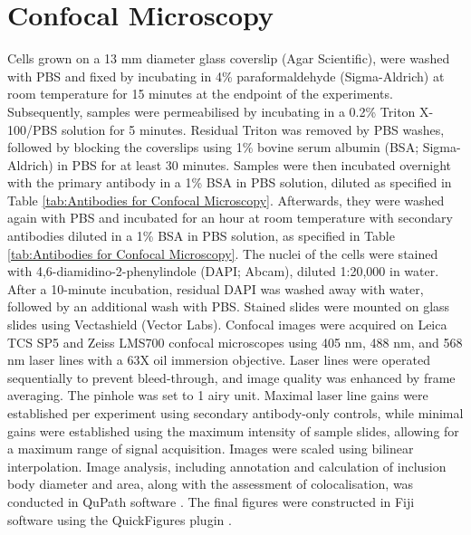 \section{Confocal Microscopy} \label{sec:Confocal Microscopy}
Cells grown on a 13 mm diameter glass coverslip (Agar Scientific), were washed with PBS and fixed by incubating in 4\% paraformaldehyde (Sigma-Aldrich) at room temperature for 15 minutes at the endpoint of the experiments. Subsequently, samples were permeabilised by incubating in a 0.2\% Triton X-100/PBS solution for 5 minutes. Residual Triton was removed by PBS washes, followed by blocking the coverslips using 1\% bovine serum albumin (BSA; Sigma-Aldrich) in PBS for at least 30 minutes. Samples were then incubated overnight with the primary antibody in a 1\% BSA in PBS solution, diluted as specified in Table \ref{tab:Antibodies for Confocal Microscopy}. Afterwards, they were washed again with PBS and incubated for an hour at room temperature with secondary antibodies diluted in a 1\% BSA in PBS solution, as specified in Table \ref{tab:Antibodies for Confocal Microscopy}. The nuclei of the cells were stained with 4,6-diamidino-2-phenylindole (DAPI; Abcam), diluted 1:20,000 in water. After a 10-minute incubation, residual DAPI was washed away with water, followed by an additional wash with PBS. Stained slides were mounted on glass slides using Vectashield (Vector Labs). Confocal images were acquired on Leica TCS SP5 and Zeiss LMS700 confocal microscopes using 405 nm, 488 nm, and 568 nm laser lines with a 63X oil immersion objective. Laser lines were operated sequentially to prevent bleed-through, and image quality was enhanced by frame averaging. The pinhole was set to 1 airy unit. Maximal laser line gains were established per experiment using secondary antibody-only controls, while minimal gains were established using the maximum intensity of sample slides, allowing for a maximum range of signal acquisition. Images were scaled using bilinear interpolation. Image analysis, including annotation and calculation of inclusion body diameter and area, along with the assessment of colocalisation, was conducted in QuPath software \cite{Bankhead2017QuPath:Analysis}. The final figures were constructed in Fiji software \cite{Schindelin2012Fiji:Analysis} using the QuickFigures plugin \cite{Mazo2021QuickFigures:Figures}.

